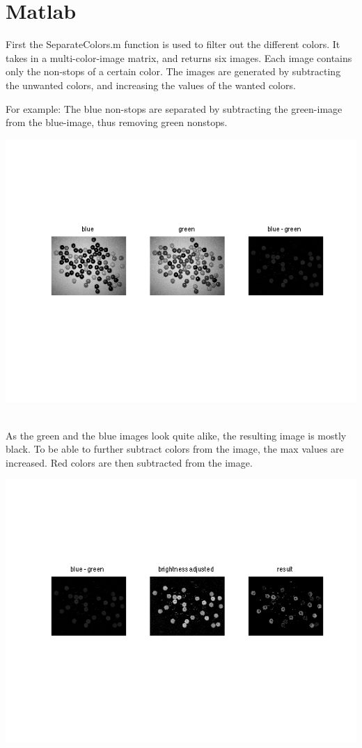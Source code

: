 \lstset{language=Matlab}
\lstset{frame=single}
\section{Matlab}
First the SeparateColors.m function is used to filter out the different colors. It takes in a multi-color-image matrix, and returns six images. Each image contains only the non-stops of a certain color. The images are generated by subtracting the unwanted colors, and increasing the values of the wanted colors.

For example: The blue non-stops are separated by subtracting the green-image from the blue-image, thus removing green nonstops. 
\\
\centerline{\includegraphics[clip=true, trim=40 100 40 80]{separate_step1.png}}
\\
As the green and the blue images look quite alike, the resulting image is mostly black. To be able to further subtract colors from the image, the max values are increased. Red colors are then subtracted from the image.
\\
\centerline{\includegraphics[clip=true, trim=40 100 40 80]{separate_step2_1.png}}
